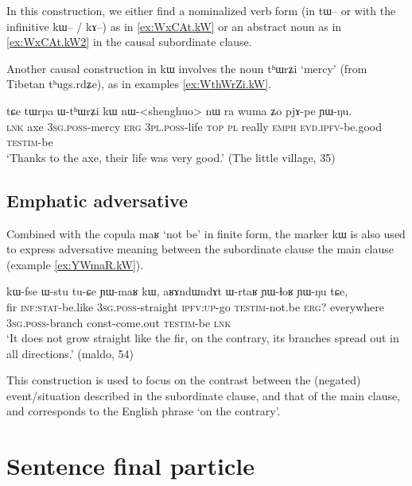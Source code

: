 \documentclass[oldfontcommands,oneside,a4paper,11pt]{article}
\newcommand{\ipa}[1]{{\phon #1}} %
\begin{document}
In this construction, we either find a nominalized verb form (in \ipa{tɯ--} or with the infinitive \ipa{kɯ--} / \ipa{kɤ--}) as in \ref{ex:WxCAt.kW} or an abstract noun as in \ref{ex:WxCAt.kW2} in the causal subordinate clause.

Another causal construction in \ipa{kɯ} involves the noun \ipa{tʰɯrʑi} `mercy' (from Tibetan \ipa{tʰugs.rdʑe}), as in examples \ref{ex:WthWrZi.kW}.

  \begin{exe}
\ex \label{ex:WthWrZi.kW}
\gll
\ipa{tɕe}  	\ipa{tɯrpa}  	\ipa{ɯ-tʰɯrʑi}  	\ipa{kɯ}  	\ipa{nɯ}-<shenghuo>  	\ipa{nɯ} \ipa{ra}  	\ipa{wuma}  	\ipa{ʑo}  	\ipa{pjɤ-pe}  	\ipa{ɲɯ-ŋu.}  \\
\textsc{lnk} axe \textsc{3sg.poss}-mercy \textsc{erg} \textsc{3pl.poss}-life \textsc{top} \textsc{pl} really \textsc{emph} \textsc{evd.ipfv}-be.good \textsc{testim}-be \\
\glt `Thanks to the axe, their life was very good.' (The little village, 35)
  \end{exe}
  
  
 \subsection{Emphatic adversative} \label{sec:advers}
Combined with the copula \ipa{maʁ} `not be' in finite form, the marker \ipa{kɯ} is also used to express adversative meaning between the subordinate clause the main clause (example \ref{ex:YWmaR.kW}).
 
  \begin{exe} 
 \ex \label{ex:YWmaR.kW}
\gll \ipa{tɯrgi} 	\ipa{kɯ-fse} 	\ipa{ɯ-stu} 	\ipa{tu-ɕe} 	\ipa{ɲɯ-maʁ} 	\ipa{kɯ,} \ipa{aʁɤndɯndɤt} 	\ipa{ɯ-rtaʁ} 	\ipa{ɲɯ-ɬoʁ} 	\ipa{ɲɯ-ŋu} 	\ipa{tɕe,} 
\\
fir \textsc{inf:stat}-be.like \textsc{3sg.poss}-straight \textsc{ipfv:up}-go \textsc{testim}-not.be \textsc{erg}? everywhere \textsc{3sg.poss}-branch const-come.out \textsc{testim}-be \textsc{lnk} \\ 
\glt `It does not grow straight like the fir, on the contrary, its branches spread out in all directions.'  
(maldo, 54)
 \end{exe}  
 
 This construction is used to focus on the contrast between the (negated) event/situation described in the subordinate clause, and that of the main clause, and corresponds to the English phrase `on the contrary'.
 
 \section{Sentence final particle} \label{sec:compl}
 
\end{document}
